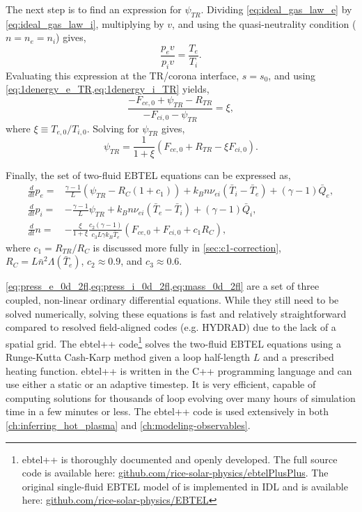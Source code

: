The next step is to find an expression for $\psi_{TR}$. Dividing \autoref{eq:ideal_gas_law_e} by \autoref{eq:ideal_gas_law_i}, multiplying by $v$, and using the quasi-neutrality condition ($n=n_e=n_i$) gives,
\begin{equation}
    \frac{p_ev}{p_iv} = \frac{T_e}{T_i}.
\end{equation}
Evaluating this expression at the TR/corona interface, $s=s_0$, and using \cref{eq:1denergy_e_TR,eq:1denergy_i_TR} yields,
\begin{equation}
    \frac{- F_{ce,0} + \psi_{TR} - R_{TR}}{- F_{ci,0} - \psi_{TR}} = \xi,
\end{equation}
where $\xi\equiv T_{e,0}/T_{i,0}$. Solving for $\psi_{TR}$ gives,
\begin{equation}\label{eq:psi_TR}
    \psi_{TR} = \frac{1}{1+\xi}(F_{ce,0} + R_{TR} - \xi F_{ci,0}).
\end{equation}

Finally, the set of two-fluid EBTEL equations can be expressed as,
\begin{align}
    \frac{d}{dt}p_e =& \frac{\gamma - 1}{L}(\psi_{TR} - R_C(1 + c_1)) + k_Bn\nu_{ei}(\bar{T}_i - \bar{T}_e) + (\gamma - 1)\bar{Q}_e,\label{eq:press_e_0d_2fl} \\
    \frac{d}{dt}p_i =& -\frac{\gamma - 1}{L}\psi_{TR} + k_Bn\nu_{ei}(\bar{T}_e - \bar{T}_i) + (\gamma - 1)\bar{Q}_i,\label{eq:press_i_0d_2fl} \\
    \frac{d}{dt}n =& -\frac{\xi}{1+\xi}\frac{c_2(\gamma - 1)}{c_3L\gamma k_B\bar{T}_e}(F_{ce,0} + F_{ci,0} + c_1R_C),\label{eq:mass_0d_2fl}
\end{align}
where $c_1=R_{TR}/R_C$ is discussed more fully in \autoref{sec:c1-correction}, $R_C=L\bar{n}^2\Lambda(\bar{T}_e)$, $c_2\approx0.9$, and $c_3\approx0.6$.

\cref{eq:press_e_0d_2fl,eq:press_i_0d_2fl,eq:mass_0d_2fl} are a set of three coupled, non-linear ordinary differential equations. While they still need to be solved numerically, solving these equations is fast and relatively straightforward compared to resolved field-aligned codes (e.g. HYDRAD) due to the lack of a spatial grid. The ebtel++ code\footnote{ebtel++ is thoroughly documented and openly developed. The full source code is available here: \href{https://github.com/rice-solar-physics/ebtelPlusPlus}{github.com/rice-solar-physics/ebtelPlusPlus}. The original single-fluid EBTEL model of \citet{klimchuk_highly_2008,cargill_enthalpy-based_2012} is implemented in IDL and is available here: \href{https://github.com/rice-solar-physics/EBTEL}{github.com/rice-solar-physics/EBTEL}} solves the two-fluid EBTEL equations using a Runge-Kutta Cash-Karp method \citep[Section 16.2]{press_numerical_1992} given a loop half-length $L$ and a prescribed heating function. ebtel++ is written in the C++ programming language and can use either a static or an adaptive timestep. It is very efficient, capable of computing solutions for thousands of loop evolving over many hours of simulation time in a few minutes or less. The ebtel++ code is used extensively in both \autoref{ch:inferring_hot_plasma} and \autoref{ch:modeling-observables}.

